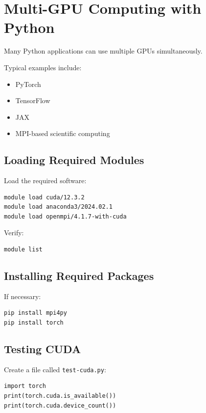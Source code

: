 \section{Multi-GPU Computing with Python} 

Many Python applications can use multiple GPUs simultaneously. 

Typical examples include: 

\begin{itemize} 
\item PyTorch 
\item TensorFlow 
\item JAX 
\item MPI-based scientific computing 
\end{itemize} 

\subsection{Loading Required Modules} 

Load the required software: 

\begin{lstlisting} 
module load cuda/12.3.2 
module load anaconda3/2024.02.1 
module load openmpi/4.1.7-with-cuda 
\end{lstlisting} 

Verify: 

\begin{lstlisting} 
module list 
\end{lstlisting}

\subsection{Installing Required Packages} 

If necessary: 

\begin{lstlisting} 
pip install mpi4py 
pip install torch 
\end{lstlisting}

\subsection{Testing CUDA} 

Create a file called \texttt{test-cuda.py}: 

\begin{lstlisting} 
import torch 
print(torch.cuda.is_available()) 
print(torch.cuda.device_count()) 
\end{lstlisting}

